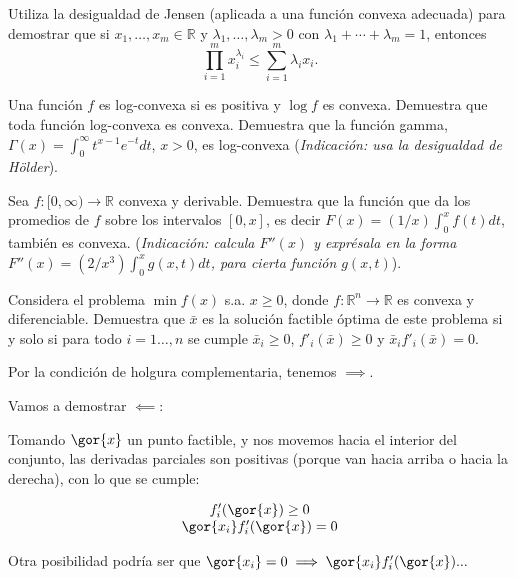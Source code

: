 \begin{problem}[5]
Utiliza la desigualdad de Jensen (aplicada a una función convexa adecuada) para demostrar que si $x_1,\ldots,x_m \in\mathbb{R}$ y $\lambda_1,\ldots,\lambda_m>0$ con $\lambda_1+\cdots + \lambda_m=1$, entonces
\[
\prod_{i=1}^m x_i^{\lambda_i} \leq \sum_{i=1}^m \lambda_i x_i.
\]

\solution

\end{problem}

\begin{problem}[6]

Una función $f$ es log-convexa si es positiva y $\log f$ es convexa. Demuestra que toda función log-convexa es convexa. Demuestra que la función gamma, $\Gamma(x)=\int_0^\infty t^{x-1} e^{-t} dt$, $x>0$, es log-convexa (\textit{Indicación: usa la desigualdad de Hölder}).

\solution

\end{problem}

\begin{problem}
Sea $f:[0,\infty)\to\mathbb{R}$ convexa y derivable. Demuestra que la función que da los promedios de $f$ sobre los intervalos $[0,x]$, es decir $F(x)=(1/x)\int_0^x f(t)dt$, también es convexa.  (\textit{Indicación: calcula $F''(x)$ y exprésala en la forma $F''(x)=(2/x^3)\int_0^x g(x,t)dt$, para cierta función $g(x,t)$}).
\solution

\end{problem}

\begin{problem}[8]

Considera el problema $\min f(x)$ s.a. $x\geq 0$, donde $f:\mathbb{R}^n\to \mathbb{R}$ es convexa y diferenciable. Demuestra que $\bar{x}$ es la solución factible óptima de este problema si y solo si  para todo $i=1\ldots,n$ se cumple $\bar{x}_i\geq 0$,  $f'_i(\bar{x})\geq 0$ y $\bar{x}_if'_i(\bar{x})=0$.


\solution

Por la condición de holgura complementaria, tenemos $\implies$.

Vamos a demostrar $\impliedby$:


Tomando $\gor{x}$ un punto factible, y nos movemos hacia el interior del conjunto, las derivadas parciales son positivas (porque van hacia arriba o hacia la derecha), con lo que se cumple:

\[
    \begin{array}{c}
        f'_i(\gor{x}) \geq 0\\
        \gor{x_i}f'_i(\gor{x}) = 0
    \end{array}
\]

Otra posibilidad podría ser que $\gor{x_i} = 0 \implies \gor{x_i}f_i'(\gor{x}) ...$
\end{problem}


